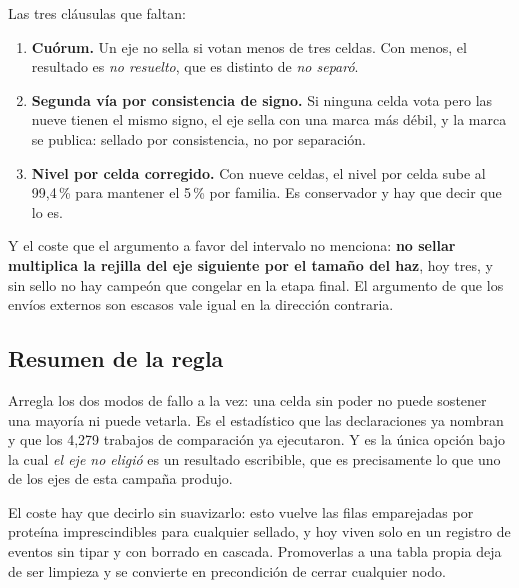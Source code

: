 Las tres cláusulas que faltan:

\begin{enumerate}[leftmargin=1.5em,itemsep=0.3em]
  \item \textbf{Cuórum.} Un eje no sella si votan menos de tres celdas. Con menos,
        el resultado es \emph{no resuelto}, que es distinto de \emph{no separó}.
  \item \textbf{Segunda vía por consistencia de signo.} Si ninguna celda vota pero
        las nueve tienen el mismo signo, el eje sella con una marca más débil, y la
        marca se publica: sellado por consistencia, no por separación.
  \item \textbf{Nivel por celda corregido.} Con nueve celdas, el nivel por celda
        sube al 99{,}4\,\% para mantener el 5\,\% por familia. Es conservador y hay
        que decir que lo es.
\end{enumerate}

Y el coste que el argumento a favor del intervalo no menciona: \textbf{no sellar
multiplica la rejilla del eje siguiente por el tamaño del haz}, hoy tres, y sin
sello no hay campeón que congelar en la etapa final. El argumento de que los envíos
externos son escasos vale igual en la dirección contraria.

\subsection{Resumen de la regla}

Arregla los dos modos de fallo a la vez: una celda sin poder no puede sostener una
mayoría ni puede vetarla. Es el estadístico que las declaraciones ya nombran y que
los 4{,}279 trabajos de comparación ya ejecutaron. Y es la única opción bajo la cual
\emph{el eje no eligió} es un resultado escribible, que es precisamente lo que uno
de los ejes de esta campaña produjo.

El coste hay que decirlo sin suavizarlo: esto vuelve las filas emparejadas por
proteína imprescindibles para cualquier sellado, y hoy viven solo en un registro de
eventos sin tipar y con borrado en cascada. Promoverlas a una tabla propia deja de
ser limpieza y se convierte en precondición de cerrar cualquier nodo.
